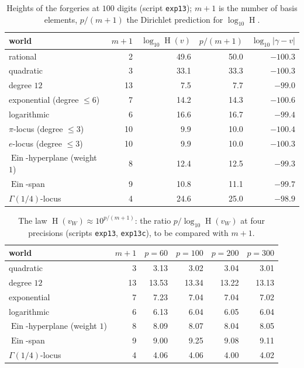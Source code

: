 \documentclass[11pt,a4paper]{article}
\newcommand{\Ein}{\operatorname{Ein}}
\DeclareMathOperator{\Ht}{H}
\theoremstyle{definition}
\theoremstyle{remark}
\numberwithin{equation}{section}
\begin{document}
\begin{table}[t]
\centering\small
\caption{Heights of the forgeries at $100$ digits (script \texttt{exp13}); $m+1$ is the
number of basis elements, $p/(m+1)$ the Dirichlet prediction for $\log_{10}\Ht$.}
\label{V:tab:gallery100}
\begin{tabular}{@{}lrrrr@{}}
\toprule
world & $m+1$ & $\log_{10}\Ht(v)$ & $p/(m+1)$ & $\log_{10}|\gamma-v|$\\
\midrule
rational & 2 & 49.6 & 50.0 & $-100.3$\\
quadratic & 3 & 33.1 & 33.3 & $-100.3$\\
degree $12$ & 13 & 7.5 & 7.7 & $-99.0$\\
exponential (degree $\le6$) & 7 & 14.2 & 14.3 & $-100.6$\\
logarithmic & 6 & 16.6 & 16.7 & $-99.4$\\
$\pi$-locus (degree $\le3$) & 10 & 9.9 & 10.0 & $-100.4$\\
$e$-locus (degree $\le3$) & 10 & 9.9 & 10.0 & $-100.3$\\
$\Ein$-hyperplane (weight $1$) & 8 & 12.4 & 12.5 & $-99.3$\\
$\Ein$-span & 9 & 10.8 & 11.1 & $-99.7$\\
$\Gamma(1/4)$-locus & 4 & 24.6 & 25.0 & $-98.9$\\
\bottomrule
\end{tabular}
\end{table}

\begin{table}[t]
\centering\small
\caption{The law $\Ht(v_W)\approx10^{p/(m+1)}$: the ratio $p/\log_{10}\Ht(v_W)$ at four
precisions (scripts \texttt{exp13}, \texttt{exp13c}), to be compared with $m+1$.}
\label{V:tab:law}
\begin{tabular}{@{}lrrrrr@{}}
\toprule
world & $m+1$ & $p=60$ & $p=100$ & $p=200$ & $p=300$\\
\midrule
quadratic & 3 & 3.13 & 3.02 & 3.04 & 3.01\\
degree $12$ & 13 & 13.53 & 13.34 & 13.22 & 13.13\\
exponential & 7 & 7.23 & 7.04 & 7.04 & 7.02\\
logarithmic & 6 & 6.13 & 6.04 & 6.05 & 6.04\\
$\Ein$-hyperplane (weight $1$) & 8 & 8.09 & 8.07 & 8.04 & 8.05\\
$\Ein$-span & 9 & 9.00 & 9.25 & 9.08 & 9.11\\
$\Gamma(1/4)$-locus & 4 & 4.06 & 4.06 & 4.00 & 4.02\\
\bottomrule
\end{tabular}
\end{table}
\end{document}
